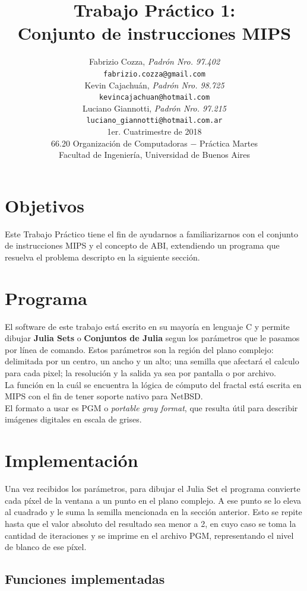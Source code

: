 \documentclass[a4paper,10pt]{article}
\title{		\textbf{Trabajo Práctico 1: \\
			Conjunto de instrucciones MIPS
			}}
\author{	Fabrizio Cozza, \textit{Padrón Nro. 97.402}                     \\
            \texttt{ fabrizio.cozza@gmail.com }                                              \\[2.5ex]
            Kevin Cajachuán, \textit{Padrón Nro. 98.725}                     \\
            \texttt{ kevincajachuan@hotmail.com }                                              \\[2.5ex]
            Luciano Giannotti, \textit{Padrón Nro. 97.215}                     \\
            \texttt{luciano\_giannotti@hotmail.com.ar}                                              \\[3.5ex]
	 \newline
            \normalsize{1er. Cuatrimestre de 2018}                                      \\
            \normalsize{66.20 Organización de Computadoras  $-$ Práctica Martes}  \\
            \normalsize{Facultad de Ingeniería, Universidad de Buenos Aires}            \\
       }
\date{}
\begin{document}
\maketitle
\thispagestyle{empty}   %
\newpage

\section{Objetivos}

Este Trabajo Práctico tiene el fin de ayudarnos a familiarizarnos con el conjunto de instrucciones MIPS y el concepto de ABI, extendiendo un programa que resuelva el problema descripto en la siguiente sección.


\section{Programa}

El software de este trabajo está escrito en su mayoría en lenguaje C y permite dibujar \textbf{Julia Sets} o \textbf{Conjuntos de Julia} segun los parámetros que le pasamos por línea de comando.
Estos parámetros son la región del plano complejo: delimitada por un centro, un ancho y un alto; una semilla que afectará el calculo para cada pixel; la resolución y la salida ya sea por pantalla o por archivo. \\
La función en la cuál se encuentra la lógica de cómputo del fractal está escrita en MIPS con el fin de tener soporte nativo para NetBSD. \\
El formato a usar es  PGM o \textit{portable gray format}, que resulta útil para describir imágenes digitales en escala de grises.


\section{Implementación}

Una vez recibidos los parámetros, para dibujar el Julia Set el programa convierte cada píxel de la ventana a un punto en el plano complejo.
A ese punto se lo eleva al cuadrado y le suma la semilla mencionada en la sección anterior. Esto se repite hasta que el valor absoluto del resultado sea menor a 2, en cuyo caso se toma la cantidad de iteraciones y se imprime en el archivo PGM, representando el nivel de blanco de ese píxel.

\subsection{Funciones implementadas}
\end{document}
